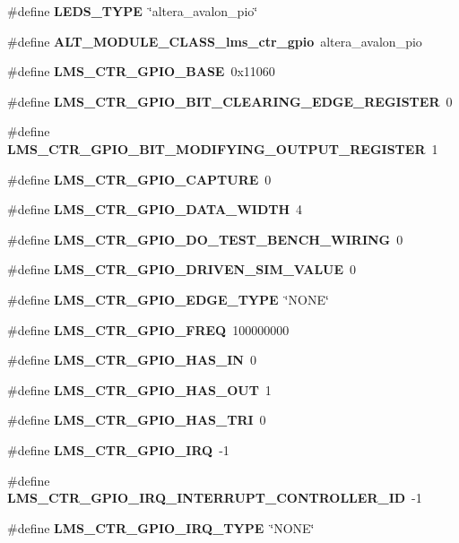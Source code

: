 \begin{DoxyCompactItemize}
\item 
\#define {\bf L\+E\+D\+S\+\_\+\+T\+Y\+PE}~\char`\"{}altera\+\_\+avalon\+\_\+pio\char`\"{}
\item 
\#define {\bf A\+L\+T\+\_\+\+M\+O\+D\+U\+L\+E\+\_\+\+C\+L\+A\+S\+S\+\_\+lms\+\_\+ctr\+\_\+gpio}~altera\+\_\+avalon\+\_\+pio
\item 
\#define {\bf L\+M\+S\+\_\+\+C\+T\+R\+\_\+\+G\+P\+I\+O\+\_\+\+B\+A\+SE}~0x11060
\item 
\#define {\bf L\+M\+S\+\_\+\+C\+T\+R\+\_\+\+G\+P\+I\+O\+\_\+\+B\+I\+T\+\_\+\+C\+L\+E\+A\+R\+I\+N\+G\+\_\+\+E\+D\+G\+E\+\_\+\+R\+E\+G\+I\+S\+T\+ER}~0
\item 
\#define {\bf L\+M\+S\+\_\+\+C\+T\+R\+\_\+\+G\+P\+I\+O\+\_\+\+B\+I\+T\+\_\+\+M\+O\+D\+I\+F\+Y\+I\+N\+G\+\_\+\+O\+U\+T\+P\+U\+T\+\_\+\+R\+E\+G\+I\+S\+T\+ER}~1
\item 
\#define {\bf L\+M\+S\+\_\+\+C\+T\+R\+\_\+\+G\+P\+I\+O\+\_\+\+C\+A\+P\+T\+U\+RE}~0
\item 
\#define {\bf L\+M\+S\+\_\+\+C\+T\+R\+\_\+\+G\+P\+I\+O\+\_\+\+D\+A\+T\+A\+\_\+\+W\+I\+D\+TH}~4
\item 
\#define {\bf L\+M\+S\+\_\+\+C\+T\+R\+\_\+\+G\+P\+I\+O\+\_\+\+D\+O\+\_\+\+T\+E\+S\+T\+\_\+\+B\+E\+N\+C\+H\+\_\+\+W\+I\+R\+I\+NG}~0
\item 
\#define {\bf L\+M\+S\+\_\+\+C\+T\+R\+\_\+\+G\+P\+I\+O\+\_\+\+D\+R\+I\+V\+E\+N\+\_\+\+S\+I\+M\+\_\+\+V\+A\+L\+UE}~0
\item 
\#define {\bf L\+M\+S\+\_\+\+C\+T\+R\+\_\+\+G\+P\+I\+O\+\_\+\+E\+D\+G\+E\+\_\+\+T\+Y\+PE}~\char`\"{}N\+O\+NE\char`\"{}
\item 
\#define {\bf L\+M\+S\+\_\+\+C\+T\+R\+\_\+\+G\+P\+I\+O\+\_\+\+F\+R\+EQ}~100000000
\item 
\#define {\bf L\+M\+S\+\_\+\+C\+T\+R\+\_\+\+G\+P\+I\+O\+\_\+\+H\+A\+S\+\_\+\+IN}~0
\item 
\#define {\bf L\+M\+S\+\_\+\+C\+T\+R\+\_\+\+G\+P\+I\+O\+\_\+\+H\+A\+S\+\_\+\+O\+UT}~1
\item 
\#define {\bf L\+M\+S\+\_\+\+C\+T\+R\+\_\+\+G\+P\+I\+O\+\_\+\+H\+A\+S\+\_\+\+T\+RI}~0
\item 
\#define {\bf L\+M\+S\+\_\+\+C\+T\+R\+\_\+\+G\+P\+I\+O\+\_\+\+I\+RQ}~-\/1
\item 
\#define {\bf L\+M\+S\+\_\+\+C\+T\+R\+\_\+\+G\+P\+I\+O\+\_\+\+I\+R\+Q\+\_\+\+I\+N\+T\+E\+R\+R\+U\+P\+T\+\_\+\+C\+O\+N\+T\+R\+O\+L\+L\+E\+R\+\_\+\+ID}~-\/1
\item 
\#define {\bf L\+M\+S\+\_\+\+C\+T\+R\+\_\+\+G\+P\+I\+O\+\_\+\+I\+R\+Q\+\_\+\+T\+Y\+PE}~\char`\"{}N\+O\+NE\char`\"{}

\end{DoxyCompactItemize}
